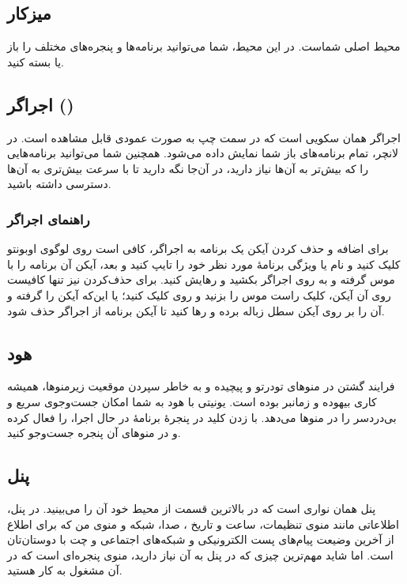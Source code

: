 \subsection{میزکار}
محیط اصلی شماست. در این محیط، شما می‌توانید برنامه‌ها و پنجره‌های مختلف را باز یا بسته کنید.
\subsection[اجراگر (Launcher)]{اجراگر ()}
اجراگر همان سکویی است که در سمت چپ به صورت عمودی قابل مشاهده است. در لانچر، تمام برنامه‌های باز شما نمایش داده می‌شود. همچنین شما می‌توانید برنامه‌هایی را که بیش‌تر به آن‌ها نیاز دارید، در آن‌جا نگه دارید تا با سرعت بیش‌تری به آن‌ها دسترسی داشته باشید.
\subsubsection{راهنمای اجراگر}
برای اضافه و حذف کردن آیکن یک برنامه به اجراگر، کافی است روی لوگوی اوبونتو کلیک کنید و نام یا ویژگی برنامهٔ مورد نظر خود را تایپ کنید و بعد، آیکن آن برنامه را با موس گرفته و به روی اجراگر بکشید و رهایش کنید. برای حذف‌کردن نیز تنها کافیست روی آن آیکن، کلیک راست موس را بزنید و روی  کلیک کنید؛ یا این‌که آیکن را گرفته و آن را بر روی آیکن سطل زباله برده و رها کنید تا آیکن برنامه از اجراگر حذف شود.
\subsection{هود}
فرایند گشتن در منوهای تودرتو و پیچیده و به خاطر سپردن موقعیت زیرمنوها، همیشه کاری بیهوده و زمانبر بوده است. یونیتی با هود به شما امکان جست‌و‌جوی سریع و بی‌دردسر را در منوها می‌دهد. با زدن کلید  در پنجرهٔ برنامهٔ در حال اجرا،  را فعال کرده و در منوهای آن پنجره جست‌وجو کنید.
\subsection{پنل}
پنل همان نواری است که در بالاترین قسمت از محیط خود آن را می‌بینید. در پنل، اطلاعاتی مانند منوی تنظیمات، ساعت و تاریخ ، صدا، شبکه و منوی من که برای اطلاع از آخرین وضیعت پیام‌های پست الکترونیکی و شبکه‌های اجتماعی و چت با دوستان‌تان است. اما شاید مهم‌ترین چیزی که در پنل به آن نیاز دارید، منوی پنجره‌ای است که در آن مشغول به کار هستید.

